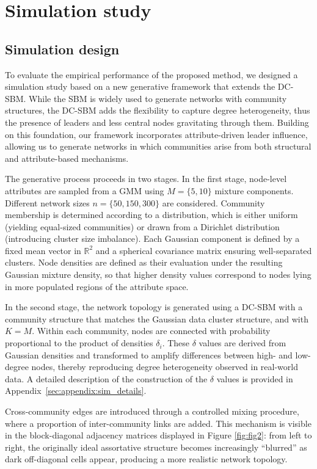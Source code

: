 \documentclass[11pt]{article}
\begin{document}
\section{Simulation study}\label{sec:simulation}

\subsection{Simulation design}

To evaluate the empirical performance of the proposed method, we designed a simulation study based on a new generative framework that extends the DC-SBM. While the SBM is widely used to generate networks with community structures, the DC-SBM adds the flexibility to capture degree heterogeneity, thus the presence of leaders and less central nodes gravitating through them. Building on this foundation, our framework incorporates attribute-driven leader influence, allowing us to generate networks in which communities arise from both structural and attribute-based mechanisms.

The generative process proceeds in two stages. In the first stage, node-level attributes are sampled from a GMM using $M = \{5, 10\}$ mixture components.  Different network sizes $n = \{50, 150, 300 \}$ are considered. Community membership is determined according to a distribution, which is either uniform (yielding equal-sized communities) or drawn from a Dirichlet distribution (introducing cluster size imbalance). Each Gaussian component is defined by a fixed mean vector in $\mathbb{R}^2$ and a spherical covariance matrix ensuring well-separated clusters. 
Node densities are defined as their evaluation under the resulting Gaussian mixture density, so that higher density values correspond to nodes lying in more populated regions of the attribute space.

In the second stage, the network topology is generated using a DC-SBM with a community structure that matches the Gaussian data cluster structure, and with $K = M$. Within each community, nodes are connected with probability proportional to the product of densities $\delta_i$. These $\delta$ values are derived from Gaussian densities and transformed to amplify differences between high- and low-degree nodes, thereby reproducing degree heterogeneity observed in real-world data. A detailed description of the construction of the $\delta$ values is provided in Appendix~\ref{sec:appendix:sim_details}.

Cross-community edges are introduced through a controlled mixing procedure, where a proportion of inter-community links are added.  This mechanism is visible in the block-diagonal adjacency matrices displayed in Figure \ref{fig:fig2}: from left to right, the originally ideal assortative structure becomes increasingly “blurred” as dark off-diagonal cells appear, producing a more realistic network topology.
\end{document}
